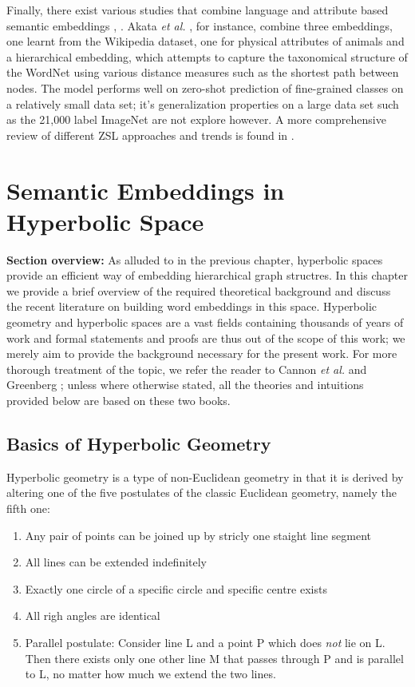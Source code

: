 \documentclass[12pt]{report}
\begin{document}
Finally, there exist various studies that combine language and attribute based semantic embeddings \cite{Akata2015}, \cite{Fu2015} \cite{Zhou2005}. Akata \textit{et al.} \cite{Akata2015}, for instance, combine three embeddings, one learnt from the Wikipedia dataset, one for physical attributes of animals and a hierarchical embedding, which attempts to capture the taxonomical structure of the WordNet using various distance measures such as the shortest path between nodes. The model performs well on zero-shot prediction of fine-grained classes on a relatively small data set; it's generalization properties on a large data set such as the 21,000 label ImageNet are not explore however. A more comprehensive review of different ZSL approaches and trends is found in \cite{Xian2017}.


\section{Semantic Embeddings in Hyperbolic Space}

\textbf{Section overview:} As alluded to in the previous chapter, hyperbolic spaces provide an efficient way of embedding hierarchical graph structres. In this chapter we provide a brief overview of the required theoretical background and discuss the recent literature on building word embeddings in this space. Hyperbolic geometry and hyperbolic spaces are a vast fields containing thousands of years of work and formal statements and proofs are thus out of the scope of this work; we merely aim to provide the background necessary for the present work. For more thorough treatment of the topic, we refer the reader to Cannon \textit{et al.} \cite{} and Greenberg \cite{Greenberg1994}; unless where otherwise stated, all the theories and intuitions provided below are based on these two books.

\subsection{Basics of Hyperbolic Geometry}
Hyperbolic geometry is a type of non-Euclidean geometry in that it is derived by altering one of the five postulates of the classic Euclidean geometry, namely the fifth one:
\begin{enumerate}
    \item Any pair of points can be joined up by stricly one staight line segment
    \item All lines can be extended indefinitely
    \item Exactly one circle of a specific circle and specific centre exists
    \item All righ angles are identical
    \item Parallel postulate: Consider line L and a point P which does \textit{not} lie on L. Then there exists only one other line M that passes through P and is parallel to L, no matter how much we extend the two lines.
\end{enumerate}
\end{document}

